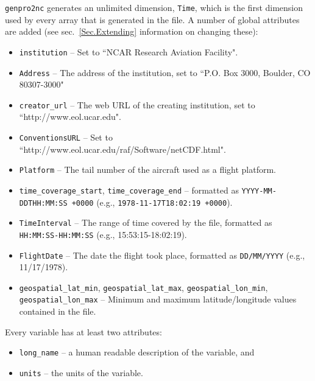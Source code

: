 \documentclass{report}
\begin{document}
\texttt{genpro2nc} generates an unlimited dimension, \texttt{Time}, which is the first dimension used by every array that is generated in the file. A number of global attributes are added (see sec.~\ref{Sec.Extending} information on changing these):
\begin{itemize}[noitemsep]
	\item \texttt{institution} -- Set to ``NCAR Research Aviation Facility".
	\item \texttt{Address} -- The address of the institution, set to ``P.O. Box 3000, Boulder, CO 80307-3000"
	\item \texttt{creator\_url} -- The web URL of the creating institution, set to ``http://www.eol.ucar.edu".
	\item \texttt{ConventionsURL} -- Set to ``http://www.eol.ucar.edu/raf/Software/netCDF.html".
	\item \texttt{Platform} -- The tail number of the aircraft used as a flight platform.
	\item \texttt{time\_coverage\_start}, \texttt{time\_coverage\_end} -- formatted as \texttt{YYYY-MM-DDTHH:MM:SS +0000} (e.g., \texttt{1978-11-17T18:02:19 +0000}).
	\item \texttt{TimeInterval} -- The range of time covered by the file, formatted as \texttt{HH:MM:SS-HH:MM:SS} (e.g., 15:53:15-18:02:19).
	\item \texttt{FlightDate} -- The date the flight took place, formatted as \texttt{DD/MM/YYYY} (e.g., 11/17/1978).
	\item \texttt{geospatial\_lat\_min}, \texttt{geospatial\_lat\_max}, \texttt{geospatial\_lon\_min}, \texttt{geospatial\_lon\_max} -- Minimum and maximum latitude/longitude values contained in the file.
\end{itemize}

Every variable has at least two attributes:
\begin{itemize}[noitemsep]
	\item \texttt{long\_name} -- a human readable description of the variable, and
	\item \texttt{units} -- the units of the variable.
\end{itemize}
\end{document}

